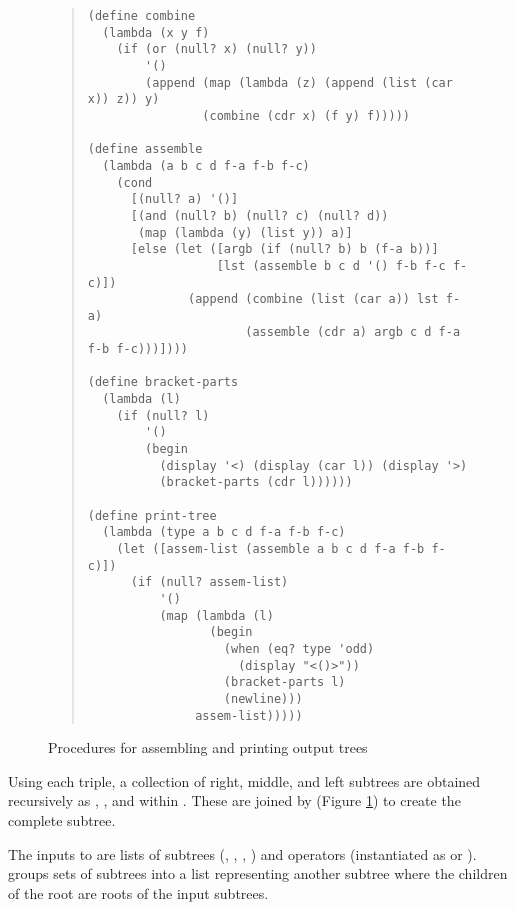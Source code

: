 \begin{figure}
\begin{frameit}
\begin{quote}
\begin{verbatim}
(define combine
  (lambda (x y f)
    (if (or (null? x) (null? y))
        '()
        (append (map (lambda (z) (append (list (car x)) z)) y)
                (combine (cdr x) (f y) f)))))

(define assemble
  (lambda (a b c d f-a f-b f-c)
    (cond
      [(null? a) '()]
      [(and (null? b) (null? c) (null? d))
       (map (lambda (y) (list y)) a)]
      [else (let ([argb (if (null? b) b (f-a b))]
                  [lst (assemble b c d '() f-b f-c f-c)])
              (append (combine (list (car a)) lst f-a)
                      (assemble (cdr a) argb c d f-a f-b f-c)))])))

(define bracket-parts
  (lambda (l)
    (if (null? l)
        '()
        (begin
          (display '<) (display (car l)) (display '>)
          (bracket-parts (cdr l))))))

(define print-tree
  (lambda (type a b c d f-a f-b f-c)
    (let ([assem-list (assemble a b c d f-a f-b f-c)])
      (if (null? assem-list)
          '()
          (map (lambda (l)
                 (begin
                   (when (eq? type 'odd)
                     (display "<()>"))
                   (bracket-parts l)
                   (newline)))
               assem-list)))))
\end{verbatim}
\end{quote}
\caption{Procedures for assembling and printing output trees}
\label{fig:output}
\end{frameit}
\end{figure}

Using each triple, a collection of right, middle, and left subtrees are
obtained recursively as , , and 
within .  These are joined by
 (Figure \ref{fig:output}) to create the complete subtree.

The inputs to  are lists of subtrees (, ,
, ) and operators (instantiated as  or ).
 groups sets of subtrees into a list
representing another subtree where the children of the root are roots of the
input subtrees.

